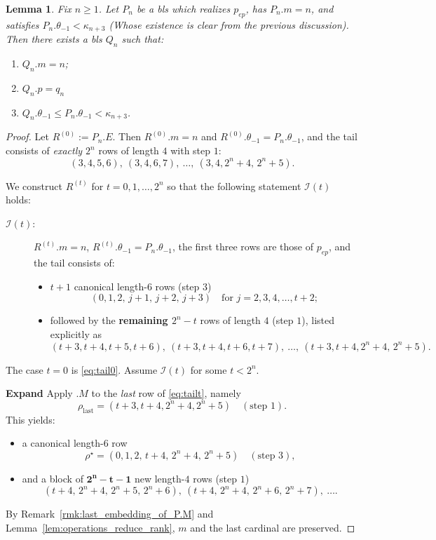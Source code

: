 \documentclass{article}
\newtheorem{lemma}{Lemma}[section]
\theoremstyle{definition}
\theoremstyle{remark}
\begin{document}
\begin{lemma}\label{lem:Qn-exists}
Fix $n\ge 1$. Let $P_n$ be a bls which realizes $p_{ep}$, has $P_n.m=n$, and satisfies $P_n.\theta_{-1}<\kappa_{n+3}$ (Whose existence is clear from the previous discussion). Then there exists a bls $Q_n$ such that:
\begin{enumerate}
\item $Q_n.m=n$;
\item $Q_n.p=q_n$
\item $Q_n.\theta_{-1}\le P_n.\theta_{-1}<\kappa_{n+3}$.
\end{enumerate}
\end{lemma}

\begin{proof}
Let $R^{(0)}:=P_n.E$. Then $R^{(0)}.m=n$ and $R^{(0)}.\theta_{-1}=P_n.\theta_{-1}$, and
the tail consists of \emph{exactly $2^n$} rows of length $4$ with step $1$:
\begin{equation}\tag{$\ast$}\label{eq:tail0}
(3,4,5,6),\ (3,4,6,7),\ \ldots,\ (3,4,2^n\!+\!4,\,2^n\!+\!5).
\end{equation}

We construct $R^{(t)}$ for $t=0,1,\dots,2^n$ so that the following statement $\mathcal I(t)$ holds:

\begin{description}
  \item[$\mathcal I(t)$:] $R^{(t)}.m=n$, $R^{(t)}.\theta_{-1}=P_n.\theta_{-1}$, the first three rows are those of $p_{ep}$, and the tail consists of:
\begin{itemize}
\item $t+1$ canonical length-$6$ rows (step $3$)
\[
(0,1,2,\,j+1,\,j+2,\,j+3)\quad\text{for } j=2,3,4,\dots,t+2;
\]
\item followed by the \textbf{remaining $2^n-t$} rows of length $4$ (step $1$), listed explicitly as
\begin{equation}\tag{$\ast_t$}\label{eq:tailt}
(t\!+\!3,t\!+\!4,t\!+\!5,t\!+\!6),\ (t\!+\!3,t\!+\!4,t\!+\!6,t\!+\!7),\ \ldots,\ (t\!+\!3,t\!+\!4,2^n\!+\!4,\,2^n\!+\!5).
\end{equation}
\end{itemize}
\end{description}

The case $t=0$ is \eqref{eq:tail0}. Assume $\mathcal I(t)$ for some $t<2^n$.

\smallskip
\textbf{Expand}
Apply $.\!M$ to the \emph{last} row of \eqref{eq:tailt}, namely
\[
\rho_{\mathrm{last}}=(t\!+\!3,t\!+\!4,2^n\!+\!4,2^n\!+\!5)\quad(\text{step }1).
\]
This yields:
\begin{itemize}
\item a canonical length-$6$ row
\[
\rho^\star=(0,1,2,\,t\!+\!4,\,2^n\!+\!4,\,2^n\!+\!5)\quad(\text{step }3),
\]
\item and a block of \(\mathbf{2^n-t-1}\) new length-$4$ rows (step $1$)
\[
(t\!+\!4,\,2^n\!+\!4,\,2^n\!+\!5,\,2^n\!+\!6),\
(t\!+\!4,\,2^n\!+\!4,\,2^n\!+\!6,\,2^n\!+\!7),\ \ldots.
\]
\end{itemize}
By Remark~\ref{rmk:last_embedding_of_P.M} and Lemma~\ref{lem:operations_reduce_rank}, $m$ and the last cardinal are preserved.


\end{proof}
\end{document}
